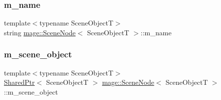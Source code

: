 \subsubsection{\texorpdfstring{m\+\_\+name}{m\_name}}
{\footnotesize\ttfamily template$<$typename Scene\+ObjectT$>$ \\
string \hyperlink{classmage_1_1_scene_node}{mage\+::\+Scene\+Node}$<$ Scene\+ObjectT $>$\+::m\+\_\+name\hspace{0.3cm}{\ttfamily [private]}}

\hypertarget{classmage_1_1_scene_node_aa05fbcdeb18d75170a5d5af70de995a9}{}\label{classmage_1_1_scene_node_aa05fbcdeb18d75170a5d5af70de995a9} 
\subsubsection{\texorpdfstring{m\+\_\+scene\+\_\+object}{m\_scene\_object}}
{\footnotesize\ttfamily template$<$typename Scene\+ObjectT$>$ \\
\hyperlink{namespacemage_a1e01ae66713838a7a67d30e44c67703e}{Shared\+Ptr}$<$ Scene\+ObjectT $>$ \hyperlink{classmage_1_1_scene_node}{mage\+::\+Scene\+Node}$<$ Scene\+ObjectT $>$\+::m\+\_\+scene\+\_\+object\hspace{0.3cm}{\ttfamily [private]}}

